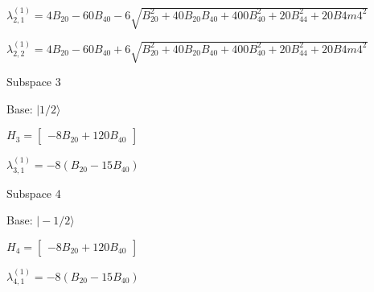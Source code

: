 \documentclass[8pt]{report}
\begin{document}
\begin{math}
\lambda_{2,1}^{(1)} = 
4 B_{20} - 60 B_{40} - 6 \sqrt{B_{20}^{2} + 40 B_{20} B_{40} + 400 B_{40}^{2} + 20 B_{44}^{2} + 20 B4m4^{2}}
\end{math}

\begin{math}
\lambda_{2,2}^{(1)} = 
4 B_{20} - 60 B_{40} + 6 \sqrt{B_{20}^{2} + 40 B_{20} B_{40} + 400 B_{40}^{2} + 20 B_{44}^{2} + 20 B4m4^{2}}
\end{math}



Subspace 3

Base: $\vert 1/2 \rangle$

\begin{math}
H_{3} = 
\left[\begin{matrix}- 8 B_{20} + 120 B_{40}\end{matrix}\right]
\end{math}

\begin{math}
\lambda_{3,1}^{(1)} = 
- 8 \left(B_{20} - 15 B_{40}\right)
\end{math}



Subspace 4

Base: $\vert -1/2 \rangle$

\begin{math}
H_{4} = 
\left[\begin{matrix}- 8 B_{20} + 120 B_{40}\end{matrix}\right]
\end{math}

\begin{math}
\lambda_{4,1}^{(1)} = 
- 8 \left(B_{20} - 15 B_{40}\right)
\end{math}
\end{document}
